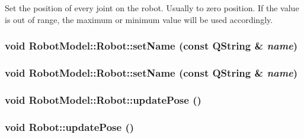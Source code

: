 Set the position of every joint on the robot. Usually to zero position. If the value is out of range, the maximum or minimum value will be used accordingly. \hypertarget{class_robot_model_1_1_robot_a0e3187d8a543ab03029138ea836ed546}{
\subsubsection[{setName}]{\setlength{\rightskip}{0pt plus 5cm}void RobotModel::Robot::setName (const QString \& {\em name})}}
\label{class_robot_model_1_1_robot_a0e3187d8a543ab03029138ea836ed546}
\hypertarget{class_robot_model_1_1_robot_a0e3187d8a543ab03029138ea836ed546}{
\subsubsection[{setName}]{\setlength{\rightskip}{0pt plus 5cm}void RobotModel::Robot::setName (const QString \& {\em name})}}
\label{class_robot_model_1_1_robot_a0e3187d8a543ab03029138ea836ed546}
\hypertarget{class_robot_model_1_1_robot_a7dc3d1bbf0e7f297503a7ed8c89dd63b}{
\subsubsection[{updatePose}]{\setlength{\rightskip}{0pt plus 5cm}void RobotModel::Robot::updatePose ()}}
\label{class_robot_model_1_1_robot_a7dc3d1bbf0e7f297503a7ed8c89dd63b}
\hypertarget{class_robot_model_1_1_robot_a7338994f0ab4baa6e5d08751272b63ca}{
\subsubsection[{updatePose}]{\setlength{\rightskip}{0pt plus 5cm}void Robot::updatePose ()}}
\label{class_robot_model_1_1_robot_a7338994f0ab4baa6e5d08751272b63ca}


